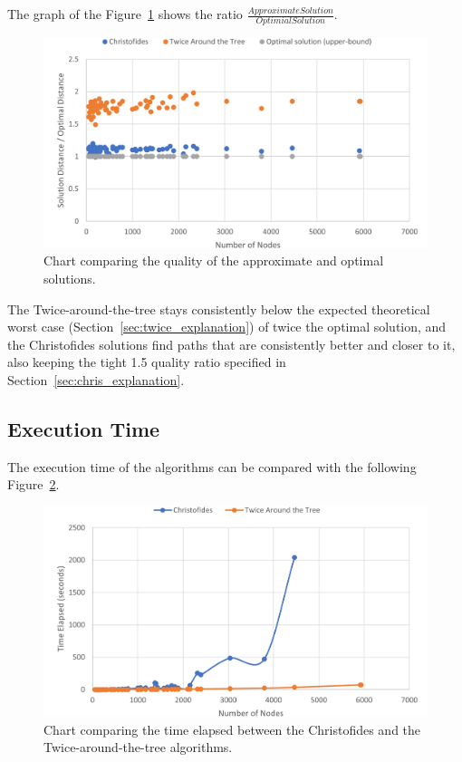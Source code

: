 \documentclass[12pt]{article}
\begin{document}
The graph of the Figure~\ref{fig:quality_ratio} shows the ratio $\frac{Approximate Solution}{Optimial Solution}$.

\begin{figure}[ht]
\centering
\includegraphics[height=.325\textheight]{quality_ratio.png}
\caption{Chart comparing the quality of the approximate and optimal solutions.}
\label{fig:quality_ratio}
\end{figure}

The Twice-around-the-tree stays consistently below the expected theoretical worst case (Section~\ref{sec:twice_explanation}) of 
twice the optimal solution, and the Christofides solutions find paths that are consistently better and closer to it, 
also keeping the tight 1.5 quality ratio specified in Section~\ref{sec:chris_explanation}.

\subsection{Execution Time} \label{sec:exp_time}

The execution time of the algorithms can be compared with the following Figure~\ref{fig:exec_time}.

\begin{figure}[ht]
\centering
\includegraphics[height=.325\textheight]{execution_time_comparison.png}
\caption{Chart comparing the time elapsed between the Christofides and the Twice-around-the-tree algorithms.}
\label{fig:exec_time}
\end{figure}
\end{document}
